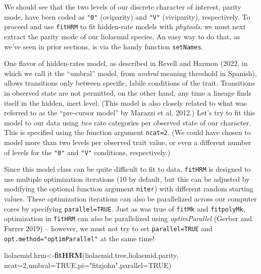 \documentclass[fleqn,10pt,lineno]{wlpeerj} %
\newenvironment{Shaded}{\begin{snugshade}}{\end{snugshade}}
\newcommand{\AttributeTok}[1]{\textcolor[rgb]{0.13,0.29,0.53}{#1}}
\newcommand{\ConstantTok}[1]{\textcolor[rgb]{0.56,0.35,0.01}{#1}}
\newcommand{\DecValTok}[1]{\textcolor[rgb]{0.00,0.00,0.81}{#1}}
\newcommand{\FunctionTok}[1]{\textcolor[rgb]{0.13,0.29,0.53}{\textbf{#1}}}
\newcommand{\NormalTok}[1]{#1}
\newcommand{\OtherTok}[1]{\textcolor[rgb]{0.56,0.35,0.01}{#1}}
\newcommand{\SpecialCharTok}[1]{\textcolor[rgb]{0.81,0.36,0.00}{\textbf{#1}}}
\newcommand{\StringTok}[1]{\textcolor[rgb]{0.31,0.60,0.02}{#1}}
\begin{document}
We should see that the two levels of our discrete character of interest, parity mode, have been coded as \texttt{"0"} (oviparity) and \texttt{"V"} (viviparity), respectively. To proceed and use \texttt{fitHRM} to fit hidden-rate models with \emph{phytools}, we must next extract the parity mode of our liolaemid species. An easy way to do that, as we've seen in prior sections, is via the handy function \texttt{setNames}.

\begin{Shaded}
\end{Shaded}

One flavor of hidden-rates model, as described in Revell and Harmon (2022, in which we call it the ``umbral'' model, from \emph{umbral} meaning threshold in Spanish), allows transitions only between specific, labile conditions of the trait. Transitions in observed state are not permitted, on the other hand, any time a lineage finds itself in the hidden, inert level. (This model is also closely related to what was referred to as the ``pre-cursor model'' by Marazzi et al. 2012.) Let's try to fit this model to our data using \emph{two} rate categories per observed state of our character. This is specified using the function argument \texttt{ncat=2}. (We could have chosen to model more than two levels per observed trait value, or even a different number of levels for the \texttt{"0"} and \texttt{"V"} conditions, respectively.)

Since this model class can be quite difficult to fit to data, \texttt{fitHRM} is designed to use multiple optimization iterations (10 by default, but this can be adjusted by modifying the optional function argument \texttt{niter}) with different random starting values. These optimization iterations can also be parallelized across our computer cores by specifying \texttt{parallel=TRUE}. Just as was true of \texttt{fitMk} and \texttt{fitpolyMk}, optimization in \texttt{fitHRM} can \emph{also} be parallelized using \emph{optimParallel} (Gerber and Furrer 2019) -- however, we must not try to set \texttt{parallel=TRUE} and \texttt{opt.method="optimParallel"} at the same time!

\begin{Shaded}
\begin{Highlighting}[]
\NormalTok{liolaemid.hrm}\OtherTok{\textless{}{-}}\FunctionTok{fitHRM}\NormalTok{(liolaemid.tree,liolaemid.parity,}
  \AttributeTok{ncat=}\DecValTok{2}\NormalTok{,}\AttributeTok{umbral=}\ConstantTok{TRUE}\NormalTok{,}\AttributeTok{pi=}\StringTok{"fitzjohn"}\NormalTok{,}\AttributeTok{parallel=}\ConstantTok{TRUE}\NormalTok{)}
\end{Highlighting}
\end{Shaded}
\end{document}
